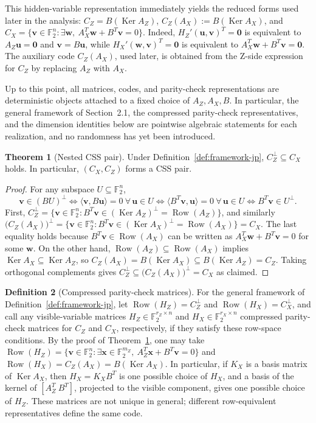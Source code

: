\documentclass[11pt]{article}
\theoremstyle{definition}
\newtheorem{theorem}{Theorem}[section]
\newtheorem{definition}[theorem]{Definition}
\newcommand{\F}{\mathbb F}
\newcommand{\Row}{\operatorname{Row}}
\newcommand{\Ker}{\operatorname{Ker}}
\newcommand{\bu}{\mathbf u}
\newcommand{\bx}{\mathbf x}
\newcommand{\bv}{\mathbf v}
\newcommand{\bw}{\mathbf w}
\newcommand{\zeros}{\mathbf 0}
\newcommand{\CZ}{C_Z}
\newcommand{\CX}{C_X}
\begin{document}
This hidden-variable representation immediately yields the reduced forms used later in the analysis: \(\CZ=B(\Ker A_Z)\), \(C_Z(A_X):=B(\Ker A_X)\), and \(\CX=\{\bv\in\F_2^n:\exists \bw,\ A_X^T \bw+B^T \bv=0\}\). Indeed, \(H_Z'(\bu,\bv)^T=\zeros\) is equivalent to \(A_Z\bu=\zeros\) and \(\bv=B\bu\), while \(H_X'(\bw,\bv)^T=\zeros\) is equivalent to \(A_X^T\bw+B^T\bv=\zeros\). The auxiliary code \(C_Z(A_X)\), used later, is obtained from the Z-side expression for \(\CZ\) by replacing \(A_Z\) with \(A_X\).

Up to this point, all matrices, codes, and parity-check representations are deterministic objects attached to a fixed choice of \(A_Z,A_X,B\). In particular, the general framework of Section~2.1, the compressed parity-check representatives, and the dimension identities below are pointwise algebraic statements for each realization, and no randomness has yet been introduced.

\begin{theorem}[Nested CSS pair]\label{prop:css-jp}
Under Definition~\ref{def:framework-jp}, \(\CZ^\perp\subseteq \CX\) holds. In particular, \((\CX,\CZ)\) forms a CSS pair.
\end{theorem}

\begin{proof}
For any subspace \(U\subseteq\F_2^n\),
\[
\bv\in (BU)^\perp
\iff
\langle \bv,B\bu\rangle =0\ \forall\,\bu\in U
\iff
\langle B^T\bv,\bu\rangle =0\ \forall\,\bu\in U
\iff
B^T\bv\in U^\perp.
\]
First,
\(\CZ^\perp=\{\bv\in\F_2^n:B^T\bv\in(\Ker A_Z)^\perp=\Row(A_Z)\}\),
and similarly
\(\bigl(C_Z(A_X)\bigr)^\perp=\{\bv\in\F_2^n:B^T\bv\in(\Ker A_X)^\perp=\Row(A_X)\}=\CX\).
The last equality holds because \(B^T\bv\in\Row(A_X)\) can be written as
\(A_X^T\bw+B^T\bv=0\) for some \(\bw\).
On the other hand, \(\Row(A_Z)\subseteq \Row(A_X)\) implies \(\Ker A_X\subseteq \Ker A_Z\), so
\(
C_Z(A_X)=B(\Ker A_X)\subseteq B(\Ker A_Z)=\CZ
\).
Taking orthogonal complements gives
\(
\CZ^\perp\subseteq \bigl(C_Z(A_X)\bigr)^\perp=\CX
\)
as claimed.
\end{proof}

\begin{definition}[Compressed parity-check matrices]\label{def:compressed-pcm-jp}
For the general framework of Definition~\ref{def:framework-jp}, let \(\Row(H_Z)=\CZ^\perp\) and \(\Row(H_X)=\CX^\perp\), and call any visible-variable matrices \(H_Z\in\F_2^{r_Z\times n}\) and \(H_X\in\F_2^{r_X\times n}\) compressed parity-check matrices for \(\CZ\) and \(\CX\), respectively, if they satisfy these row-space conditions.
By the proof of Theorem~\ref{prop:css-jp}, one may take
\(\Row(H_Z)=\{\bv\in\F_2^n:\exists \bx\in\F_2^{m_Z},\ A_Z^T\bx+B^T\bv=0\}\)
and
\(\Row(H_X)=C_Z(A_X)=B(\Ker A_X)\).
In particular, if \(K_X\) is a basis matrix of \(\Ker A_X\), then \(H_X=K_XB^T\) is one possible choice of \(H_X\), and a basis of the kernel of \([A_Z^T\ B^T]\), projected to the visible component, gives one possible choice of \(H_Z\).
These matrices are not unique in general; different row-equivalent representatives define the same code.
\end{definition}
\end{document}
